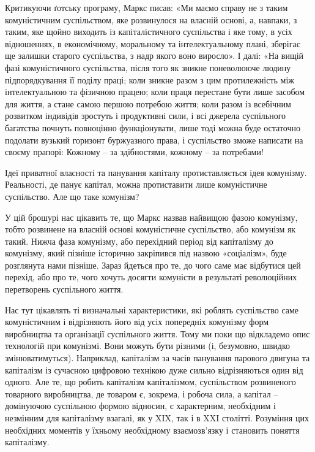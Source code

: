 \documentclass[12pt,a4paper,openany]{book}
\begin{document}
Критикуючи ґотську програму, Маркс писав: «Ми маємо справу не з таким комуністичним суспільством, яке розвинулося на власній основі, а, навпаки, з таким, яке щойно виходить із капіталістичного суспільства і яке тому, в усіх відношеннях, в економічному, моральному та інтелектуальному плані, зберігає ще залишки старого суспільства, з надр якого воно виросло». І далі: «На вищій фазі комуністичного суспільства, після того як зникне поневолююче людину підпорядкування її поділу праці; коли зникне разом з цим протилежність між інтелектуальною та фізичною працею; коли праця перестане бути лише засобом для життя, а стане самою першою потребою життя; коли разом із всебічним розвитком індивідів зростуть і продуктивні сили, і всі джерела суспільного багатства почнуть повноцінно функціонувати, лише тоді можна буде остаточно подолати вузький горизонт буржуазного права, і суспільство зможе написати на своєму прапорі: Кожному – за здібностями, кожному – за потребами!

Ідеї приватної власності та панування капіталу протиставляється ідея комунізму. Реальності, де панує капітал, можна протиставити лише комуністичне суспільство. Але що таке комунізм?

У цій брошурі нас цікавить те, що Маркс назвав найвищою фазою комунізму, тобто розвинене на власній основі комуністичне суспільство, або комунізм як такий. Нижча фаза комунізму, або перехідний період від капіталізму до комунізму, який пізніше історично закріпився під назвою «соціалізм», буде розглянута нами пізніше. Зараз йдеться про те, до чого саме має відбутися цей перехід, або про те, чого хочуть досягти комуністи в результаті революційних перетворень суспільного життя.

Нас тут цікавлять ті визначальні характеристики, які роблять суспільство саме комуністичним і відрізняють його від усіх попередніх комунізму форм виробництва та організації суспільного життя. Тому ми поки що відкладемо опис технологій при комунізмі. Вони можуть бути різними (і, безумовно, швидко змінюватимуться). Наприклад, капіталізм за часів панування парового двигуна та капіталізм із сучасною цифровою технікою дуже сильно відрізняються один від одного. Але те, що робить капіталізм капіталізмом, суспільством розвиненого товарного виробництва, де товаром є, зокрема, і робоча сила, а капітал – домінуючою суспільною формою відносин, є характерним, необхідним і незмінним для капіталізму взагалі, як у XIX, так і в XXI столітті. Розуміння цих необхідних моментів у їхньому необхідному взаємозв’язку і становить поняття капіталізму.
\end{document}
